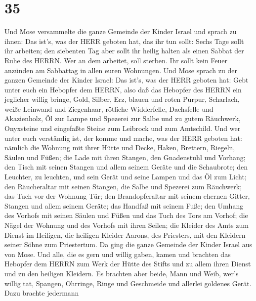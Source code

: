 \hypertarget{section-34}{%
\section{35}\label{section-34}}

 Und Mose versammelte die ganze Gemeinde der Kinder Israel
und sprach zu ihnen: Das ist's, was der HERR geboten hat, das ihr tun
sollt:  Sechs Tage sollt ihr arbeiten; den siebenten Tag
aber sollt ihr heilig halten als einen Sabbat der Ruhe des HERRN. Wer an
dem arbeitet, soll sterben.  Ihr sollt kein Feuer anzünden
am Sabbattag in allen euren Wohnungen.  Und Mose sprach zu
der ganzen Gemeinde der Kinder Israel: Das ist's, was der HERR geboten
hat:  Gebt unter euch ein Hebopfer dem HERRN, also daß das
Hebopfer des HERRN ein jeglicher willig bringe, Gold, Silber, Erz,
 blauen und roten Purpur, Scharlach, weiße Leinwand und
Ziegenhaar,  rötliche Widderfelle, Dachsfelle und
Akazienholz,  Öl zur Lampe und Spezerei zur Salbe und zu
gutem Räuchwerk,  Onyxsteine und eingefaßte Steine zum
Leibrock und zum Amtschild.  Und wer unter euch verständig
ist, der komme und mache, was der HERR geboten hat: 
nämlich die Wohnung mit ihrer Hütte und Decke, Haken, Brettern, Riegeln,
Säulen und Füßen;  die Lade mit ihren Stangen, den
Gnadenstuhl und Vorhang;  den Tisch mit seinen Stangen und
allem seinem Geräte und die Schaubrote;  den Leuchter, zu
leuchten, und sein Gerät und seine Lampen und das Öl zum Licht;
 den Räucheraltar mit seinen Stangen, die Salbe und
Spezerei zum Räuchwerk; das Tuch vor der Wohnung Tür;  den
Brandopferaltar mit seinem ehernen Gitter, Stangen und allem seinem
Geräte; das Handfaß mit seinem Fuße;  den Umhang des
Vorhofs mit seinen Säulen und Füßen und das Tuch des Tors am Vorhof;
 die Nägel der Wohnung und des Vorhofs mit ihren Seilen;
 die Kleider des Amts zum Dienst im Heiligen, die heiligen
Kleider Aarons, des Priesters, mit den Kleidern seiner Söhne zum
Priestertum.  Da ging die ganze Gemeinde der Kinder Israel
aus von Mose.  Und alle, die es gern und willig gaben,
kamen und brachten das Hebopfer dem HERRN zum Werk der Hütte des Stifts
und zu allem ihren Dienst und zu den heiligen Kleidern.  Es
brachten aber beide, Mann und Weib, wer's willig tat, Spangen, Ohrringe,
Ringe und Geschmeide und allerlei goldenes Gerät. Dazu brachte jedermann
